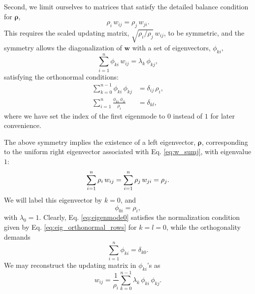 \documentclass[preprint, superscriptaddress, floatfix]{revtex4-1}
\begin{document}
Second, we limit ourselves to matrices %
that satisfy
the detailed balance condition for $\pmb\rho$,
%
\begin{equation}
  \rho_i \, w_{ij} = \rho_j \, w_{ji}
  .
  \label{eq:w_detailedbalance}
\end{equation}
%
This requires the scaled updating matrix,
$\sqrt{ \rho_i/\rho_j } \, w_{ij}$,
to be symmetric,
and the symmetry allows the diagonalization
of $\mathbf w$ with a set of
eigenvectors, $\phi_{ki}$,
%
\begin{equation}
  \sum_{i = 1}^n \phi_{ki} \, w_{ij}
  =
  \lambda_k \, \phi_{kj}
  ,
\label{eq:eig_w}
\end{equation}
%
satisfying the orthonormal conditions\cite{vankampen}:
%
\begin{align}
  \sum_{k = 0}^{n - 1}
    \phi_{ki} \, \phi_{kj}
  &=
  \delta_{ij} \, \rho_i,
  \label{eq:eig_orthonormal_cols}
  \\
  \sum_{i = 1}^n
    \frac{ \phi_{ki} \, \phi_{li} }
         { \rho_i }
  &=
  \delta_{kl}
  ,
  \label{eq:eig_orthonormal_rows}
\end{align}
%
where we have set the index of the first eigenmode to $0$
instead of $1$ for later convenience.

The above symmetry implies the existence of
a left eigenvector, $\pmb \rho$,
corresponding to the uniform right eigenvector
associated with Eq. \eqref{eq:w_sumj},
with eigenvalue $1$:
%
\begin{equation}
  \sum_{i = 1}^n \rho_i \, w_{ij}
  =
  \sum_{i = 1}^n \rho_j \, w_{ji}
  =
  \rho_j
  .
  \notag
\end{equation}
%
We will label this eigenvector by $k = 0$,
and
%
\begin{equation}
  \phi_{0i} = \rho_i,
\label{eq:eigenmode0}
\end{equation}
%
with $\lambda_0 = 1$.
%
Clearly, Eq. \eqref{eq:eigenmode0}
satisfies the normalization condition
given by Eq. \eqref{eq:eig_orthonormal_rows}
for $k = l = 0$,
while the orthogonality demands
%
\begin{equation}
  \sum_{ i = 1 }^n \phi_{ki}
  =
  \delta_{k0}
  .
\label{eq:ortho0}
\end{equation}
%
We may reconstruct the updating matrix in $\phi_{ki}$'s
as\cite{bussi2006}
%
\begin{equation}
  w_{ij}
  =
  \frac{1}{\rho_i} \sum_{k=0}^{n - 1}
  \lambda_k \, \phi_{ki} \, \phi_{kj}
  .
  \label{eq:w_from_phi}
\end{equation}
\end{document}
